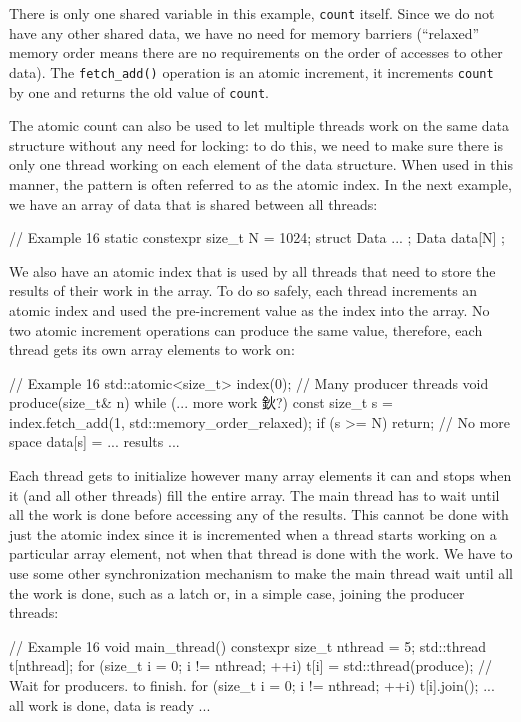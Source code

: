 There is only one shared variable in this example, \texttt{count} itself. Since we do not have any other shared data, we have no need for memory barriers (``relaxed'' memory order means there are no requirements on the order of accesses to other data). The \texttt{fetch\_add()} operation is an atomic increment, it increments \texttt{count} by one and returns the old value of \texttt{count}.

The atomic count can also be used to let multiple threads work on the same data structure without any need for locking: to do this, we need to make sure there is only one thread working on each element of the data structure. When used in this manner, the pattern is often referred to as the atomic index. In the next example, we have an array of data that is shared between all threads:

\begin{code}
// Example 16
static constexpr size_t N = 1024;
struct Data { ... };
Data data[N] {};
\end{code}

We also have an atomic index that is used by all threads that need to store the results of their work in the array. To do so safely, each thread increments an atomic index and used the pre-increment value as the index into the array. No two atomic increment operations can produce the same value, therefore, each thread gets its own array elements to work on:

\begin{code}
// Example 16
std::atomic<size_t> index(0);
// Many producer threads
void produce(size_t& n) {
  while (... more work 鈥?) {
    const size_t s =
      index.fetch_add(1, std::memory_order_relaxed);
    if (s >= N) return;     // No more space
    data[s] = ... results ...
  }
}
\end{code}

Each thread gets to initialize however many array elements it can and stops when it (and all other threads) fill the entire array. The main thread has to wait until all the work is done before accessing any of the results. This cannot be done with just the atomic index since it is incremented when a thread starts working on a particular array element, not when that thread is done with the work. We have to use some other synchronization mechanism to make the main thread wait until all the work is done, such as a latch or, in a simple case, joining the producer threads:

\begin{code}
// Example 16
void main_thread() {
  constexpr size_t nthread = 5;
  std::thread t[nthread];
  for (size_t i = 0; i != nthread; ++i) {
    t[i] = std::thread(produce);
  }
  // Wait for producers. to finish.
  for (size_t i = 0; i != nthread; ++i) {
    t[i].join();
  }
  ... all work is done, data is ready ...
}
\end{code}

